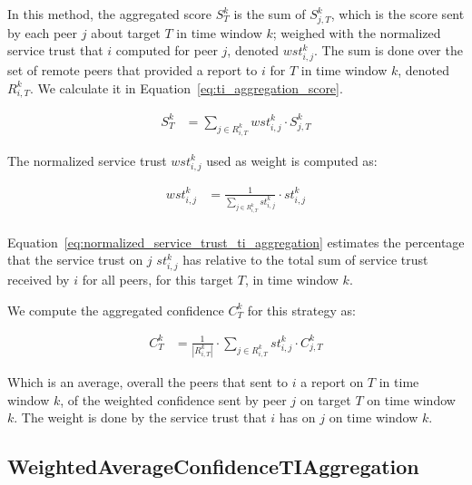 In this method, the aggregated score $S^{k}_{T}$ is the sum of $S^{k}_{j, T}$, which is the score sent by each peer $j$ about target $T$ in time window $k$; weighed with the normalized service trust that $i$ computed for peer $j$, denoted $wst^{k}_{i, j}$. The sum is done over the set of remote peers that provided a report to $i$ for $T$ in time window $k$, denoted $R^{k}_{i, T}$. We calculate it in Equation~\ref{eq:ti_aggregation_score}.

\begin{equation}
\begin{split}
    S^{k}_{T} &= \sum_{{j}\in R^{k}_{i, T}} wst^{k}_{i, j} \cdot S^{k}_{j, T}
\end{split}
\label{eq:ti_aggregation_score}
\end{equation}

\noindent
The normalized service trust $wst^{k}_{i,j}$ used as weight is computed as:

\begin{equation}
\begin{split}
    wst^{k}_{i,j} &= \frac{1}{\sum_{{j}\in R^{k}_{i, T}} st^{k}_{i, j}} \cdot st^{k}_{i, j} \\
\end{split}
\label{eq:normalized_service_trust_ti_aggregation}
\end{equation}

\noindent
Equation~\ref{eq:normalized_service_trust_ti_aggregation} estimates the percentage that the service trust on $j$ $st^{k}_{i, j}$ has relative to the total sum of service trust received by $i$ for all peers, for this target $T$, in time window $k$.

We compute the aggregated confidence $C^{k}_{T}$ for this strategy as:

\begin{equation}
\begin{split}
    C^{k}_{T} &= \frac{1}{|R^{k}_{i, T}|} \cdot \sum_{{j}\in R^{k}_{i, T}} st^{k}_{i, j} \cdot C^{k}_{j, T}
\end{split}
\end{equation}

\noindent
Which is an average, overall the peers that sent to $i$ a report on $T$ in time window $k$, of the weighted confidence sent by peer $j$ on target $T$ on time window $k$. The weight is done by the service trust that $i$ has on $j$ on time window $k$.


\subsection{WeightedAverageConfidenceTIAggregation}
\label{subsec:WeightedAverageConfidenceTIAggregation}

